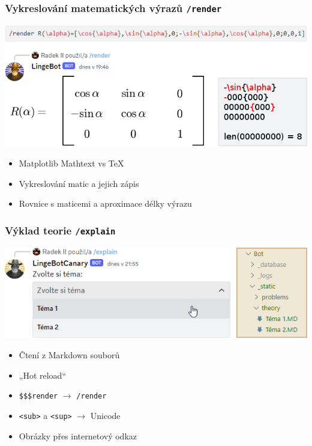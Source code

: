 \documentclass[FM]{tulpresentation} %
\begin{document}
	\begin{frame}\frametitle{Vykreslování matematických výrazů \texttt{/render}}
		\includegraphics[width=.95\paperwidth]{img/idk2}
		\begin{itemize}
			\item Matplotlib Mathtext vs TeX
			\item Vykreslování matic a jejich zápis
			\item Rovnice s maticemi a aproximace délky výrazu
		\end{itemize}
	\end{frame}
	
	\begin{frame}\frametitle{Výklad teorie \texttt{/explain}}
		\includegraphics[width=.95\paperwidth]{img/idk3}
		\begin{itemize}
			\item Čtení z Markdown souborů
			\item „Hot reload“
			\item \texttt{\$\$\$render} $\to$ \texttt{/render}
			\item \texttt{<sub>} a \texttt{<sup>} $\to$ Unicode
			\item Obrázky přes internetový odkaz
		\end{itemize}
	\end{frame}
	
\end{document}
